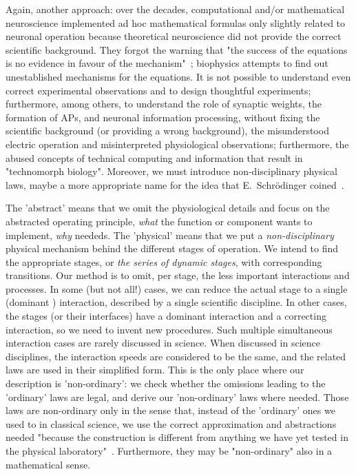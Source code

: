 Again, another approach: over the decades, computational and/or mathematical neuroscience implemented
ad hoc mathematical formulas only slightly related to neuronal operation because
theoretical neuroscience did not provide the correct scientific background.
They forgot the warning that "the success of the
equations is no evidence in favour of the mechanism"~\cite{HodgkinHuxley:1952}; biophysics attempts to
find out unestablished mechanisms for the equations. 
It is not possible to understand even correct experimental observations and to design thoughtful experiments; furthermore, among others, to understand the role of synaptic weights,
the formation of 
\gls{AP}s,
and neuronal information processing, without
fixing the scientific background (or providing a wrong background), the 
misunderstood electric operation and misinterpreted physiological observations; furthermore, the abused concepts of technical computing and information that result in "technomorph biology"\cite{VeghTechnomorphBiology:2025}.
Moreover, we must introduce non-disciplinary physical laws,
maybe a more appropriate name for the idea that E.~Schrödinger coined~\cite{Schrodinger:1992}.


 The 'abstract' means that 
we omit the physiological details and focus on the abstracted operating principle,
\textit{what} the function or component wants to implement,
\textit{why} neededs. The 'physical' means that 
we put a \textit{non-disciplinary} physical mechanism behind the different stages of operation. 
We intend to find the appropriate stages, or \textit{the series of dynamic stages},
with corresponding transitions.
Our method is to omit, per stage, the less important interactions and processes.
In some (but not all!) cases, we can reduce the actual stage to a single (dominant )
interaction, described by a single scientific discipline. In other cases,
the stages (or their interfaces) 
have a dominant interaction and a correcting interaction, so
we need to invent new procedures.  Such multiple simultaneous
interaction cases are rarely discussed in science. When discussed in science disciplines,
the interaction speeds are considered to be the same, and the
related laws are used in their simplified form. This is the only place where our description is 'non-ordinary':
we check whether the omissions leading to the 'ordinary' laws are legal,
and derive our 'non-ordinary' laws where needed.
Those laws are non-ordinary only in the sense that, instead of the 'ordinary' ones
we used to in classical science, we use the correct approximation and abstractions needed
"because the construction is different from anything we have yet tested
in the physical laboratory"~\cite{Schrodinger:1992}.
Furthermore, they may be "non-ordinary" also in a mathematical sense.



